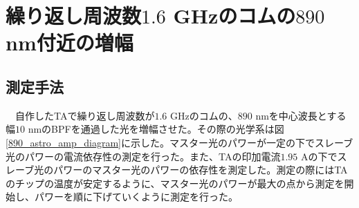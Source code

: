 \documentclass[uplatex, dvipdfmx, a4paper, report, papersize, 11pt]{jsbook}
\begin{document}
\section{繰り返し周波数$1.6$ GHzのコムの$890$ nm付近の増幅}
\subsection{測定手法}
　自作したTAで繰り返し周波数が$1.6$ GHzのコムの、$890$ nmを中心波長とする幅$10$ nmのBPFを通過した光を増幅させた。その際の光学系は図\ref{890_astro_amp_diagram}に示した。マスター光のパワーが一定の下でスレーブ光のパワーの電流依存性の測定を行った。また、TAの印加電流$1.95$ Aの下でスレーブ光のパワーのマスター光のパワーの依存性を測定した。測定の際にはTAのチップの温度が安定するように、マスター光のパワーが最大の点から測定を開始し、パワーを順に下げていくように測定を行った。
\end{document}
